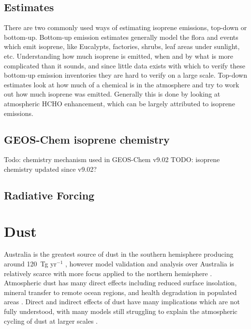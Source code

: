     
  
  \subsection{Estimates}
    There are two commonly used ways of estimating isoprene emissions, top-down or bottom-up.
    Bottom-up emission estimates generally model the flora and events which emit isoprene, like Eucalypts, factories, shrubs, leaf areas under sunlight, etc.
    Understanding how much isoprene is emitted, when and by what is more complicated than it sounds, and since little data exists with which to verify these bottom-up emission inventories they are hard to verify on a large scale.
    Top-down estimates look at how much of a chemical is in the atmosphere and try to work out how much isoprene was emitted.
    Generally this is done by looking at atmospheric HCHO enhancement, which can be largely attributed to isoprene emissions.
  
  \subsection{GEOS-Chem isoprene chemistry}
    Todo: \citep{Mao2013} chemistry mechanism used in GEOS-Chem v9.02
    TODO: isoprene chemistry updated since v9.02?  
  
  \subsection{Radiative Forcing}

    
\section{Dust}
\label{ch1:sec:dust}

  Australia is the greatest source of dust in the southern hemisphere producing around 120~Tg yr$^{-1}$ \citep{Li_2008}, however model validation and analysis over Australia is relatively scarce with more focus applied to the northern hemisphere \citep{Duncan_Fairlie_2007,Ridley_2013}.
  Atmospheric dust has many direct effects including reduced surface insolation, mineral transfer to remote ocean regions, and health degradation in populated areas \citep{Shao_2007}.
  Direct and indirect effects of dust have many implications which are not fully understood, with many models still struggling to explain the atmospheric cycling of dust at larger scales \citep{Rotstayn_2011}.

